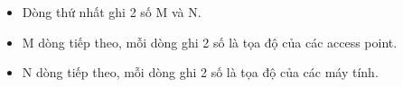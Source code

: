 \begin{itemize}
	\item Dòng thứ nhất ghi 2 số M và N.
	\item M dòng tiếp theo, mỗi dòng ghi 2 số là tọa độ của các access point.
	\item N dòng tiếp theo, mỗi dòng ghi 2 số là tọa độ của các máy tính.
\end{itemize}